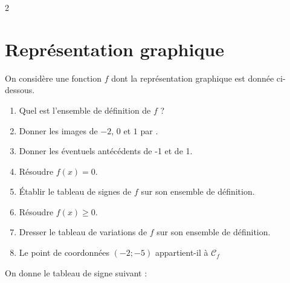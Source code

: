 \documentclass[10pt,a4paper]{article}
\begin{document}
\begin{multicols}{2}

\section{Représentation graphique}

\begin{exo}[Rappels][]
On considère une fonction \(f\) dont la représentation graphique est donnée ci-dessous.


\begin{enumerate}[leftmargin=*]
    \item Quel est l'ensemble de définition de \(f\) ?
    \item Donner les images de \(-2\), \(0\) et \(1\) par \(\).
    \item Donner les éventuels antécédents de -1 et de 1.
    \item Résoudre \(f(x)=0\).
    \item Établir le tableau de signes de \(f\) sur son ensemble de définition.
    \item Résoudre \(f(x) \geq 0\).
    \item Dresser le tableau de variations de \(f\) sur son ensemble de définition.
    \item Le point de coordonnées \((-2;-5)\) appartient-il à \(\mathcal{C}_f\)
\end{enumerate}
\end{exo}


\begin{exo}[][appro]
On donne le tableau de signe suivant :

\begin{center}
\end{center}


\end{exo}
\end{multicols}
\end{document}
